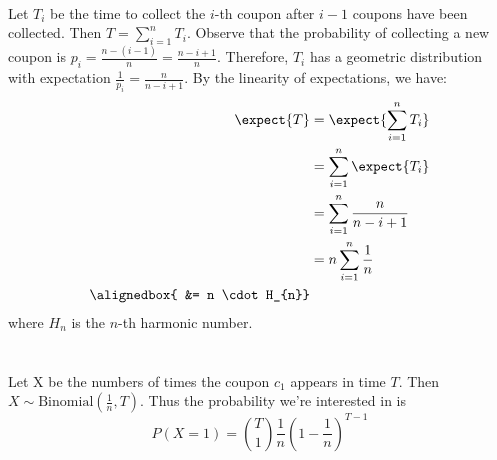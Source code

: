 \documentclass[
  coursecode={MTHE 455},
  assignmentname={Assignment \assignmentnumber},
  studentnumber=20053722,
  name={Bryan Hoang}
]{
  ltxanswer%
}
\begin{document}
  \begin{questions}
    \setcounter{question}{\questionnumber}
    \addtocounter{question}{-1}
    \question\
    \begin{parts}
      \part{}
      \begin{solution}
        Let \(T_{i}\) be the time to collect the \(i\)-th coupon after \(i-1\) coupons
        have been collected. Then \(T = \sum_{i=1}^{n} T_{i}\). Observe that the
        probability of collecting a new coupon is \(p_{i} = \frac{n-(i-1)}{n} =
        \frac{n-i+1}{n}\). Therefore, \(T_{i}\) has a geometric distribution with
        expectation \(\frac{1}{p_{i}} = \frac{n}{n-i+1}\). By the linearity of
        expectations, we have:
        \begin{align*}
          \expect{T}   &= \expect{\sum_{i=1}^{n} T_{i}}  \\
                       &= \sum_{i=1}^{n} \expect{T_{i}}  \\
                       &= \sum_{i=1}^{n} \frac{n}{n-i+1} \\
                       &= n \sum_{i=1}^{n} \frac{1}{n}   \\
          \alignedbox{ &= n \cdot H_{n}}
        \end{align*}
        where \(H_{n}\) is the \(n\)-th harmonic number.
      \end{solution}

      \part{}
      \begin{solution}
        Let X be the numbers of times the coupon \(c_{1}\) appears in time
        \(T\). Then \(X\sim\mathrm{Binomial}(\frac{1}{n},T)\). Thus the
        probability we're interested in is
        \begin{equation*}
          \boxed{P(X=1) = \binom{T}{1} \frac{1}{n} \left(1-\frac{1}{n}\right)^{T-1}}
        \end{equation*}
      \end{solution}
    \end{parts}
  \end{questions}
\end{document}
